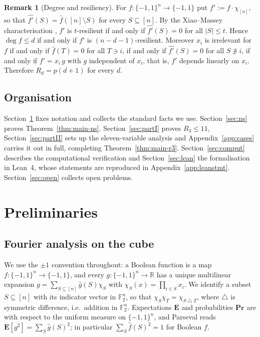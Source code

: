 \documentclass[11pt,reqno]{amsart}
\theoremstyle{plain}
\theoremstyle{definition}
\newtheorem{remark}[theorem]{Remark}
\numberwithin{theorem}{section}
\newcommand{\cube}{\{-1,1\}}
\newcommand{\Ex}{\mathbf{E}}
\newcommand{\Prb}{\mathbf{Pr}}
\newcommand{\sd}{\mathbin{\triangle}}
\newcommand{\bbF}{\mathbb{F}}
\newcommand{\bbR}{\mathbb{R}}
\newcommand{\Fhat}[1]{\widehat{#1}}
\begin{document}
\begin{remark}[Degree and resiliency]\label{rem:resilient}
For $f\colon \{-1,1\}^n \to \{-1,1\}$ put $f' := f \cdot \chi_{[n]}$, so that
$\Fhat{f'}(S) = \Fhat{f}([n] \setminus S)$ for every $S \subseteq [n]$. By the Xiao--Massey
characterisation \cite{XM88}, $f'$ is $t$-resilient if and only if $\Fhat{f'}(S) = 0$ for all
$|S| \le t$. Hence $\deg f \le d$ if and only if $f'$ is $(n-d-1)$-resilient. Moreover $x_i$ is
irrelevant for $f$ if and only if $\Fhat{f}(T) = 0$ for all $T \ni i$, if and only if
$\Fhat{f'}(S) = 0$ for all $S \not\ni i$, if and only if $f' = x_i\, g$ with $g$ independent of
$x_i$, that is, $f'$ depends linearly on $x_i$. Therefore $R_d = p(d+1)$ for every $d$.
\end{remark}

\subsection{Organisation}
Section~\ref{sec:prelim} fixes notation and collects the standard facts we use.
Section~\ref{sec:ns} proves Theorem~\ref{thm:main-ns}. Section~\ref{sec:partI} proves
$R_3 \le 11$, Section~\ref{sec:partII} sets up the eleven-variable analysis and
Appendix~\ref{app:cases} carries it out in full, completing Theorem~\ref{thm:main-r3}.
Section~\ref{sec:comput} describes the computational verification and Section~\ref{sec:lean} the
formalisation in Lean~4, whose statements are reproduced in Appendix~\ref{app:leanstmt}.
Section~\ref{sec:open} collects open problems.

\section{Preliminaries}\label{sec:prelim}

\subsection{Fourier analysis on the cube}
We use the $\pm 1$ convention throughout: a Boolean function is a map
$f \colon \cube^n \to \cube$, and every $g \colon \cube^n \to \bbR$ has a unique multilinear
expansion $g = \sum_{S \subseteq [n]} \Fhat{g}(S) \chi_S$ with $\chi_S(x) = \prod_{i \in S}x_i$.
We identify a subset $S \subseteq [n]$ with its indicator vector in $\bbF_2^n$, so that
$\chi_S \chi_T = \chi_{S \sd T}$, where $\sd$ is symmetric difference, i.e.\ addition in
$\bbF_2^n$. Expectations $\Ex$ and probabilities $\Prb$ are with respect to the uniform measure
on $\cube^n$, and Parseval reads $\Ex[g^2] = \sum_S \Fhat{g}(S)^2$; in particular
$\sum_S \Fhat{f}(S)^2 = 1$ for Boolean $f$.
\end{document}
